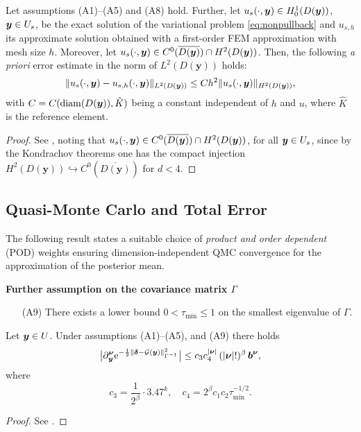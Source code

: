 \documentclass[graybox]{svmult}
\begin{document}
\begin{theorem}
    \label{thm: FEM-L2}
    Let assumptions {\rm (A1)--(A5)} and {\rm (A8)} hold. Further, let $u_s(\cdot, {\boldsymbol{y}}) \in H_0^1(D(\boldsymbol{y}))$, ${\boldsymbol{y}} \in U_s$, be the exact solution of the variational problem \eqref{eq:nonpullback} and $u_{s, h}$ its approximate solution obtained with a first-order FEM approximation with mesh size $h$. Moreover, let $u_s(\cdot, {\boldsymbol{y}}) \in C^0(\overline{D(\boldsymbol{y})}) \cap H^{2}(D(\boldsymbol{y}))$. Then, the following \textit{a priori} error estimate in the norm of $L^2(D(\boldsymbol{y}))$ holds:
    $$
       \| u_s(\cdot, {\boldsymbol{y}}) - u_{s, h}(\cdot, {\boldsymbol{y}}) \|_{L^2(D(\boldsymbol{y}))} \leq C h^{2} \| u_s(\cdot, {\boldsymbol{y}}) \|_{H^{2}(D(\boldsymbol{y}))},
    $$
    with $C = C({\rm diam}(D(\boldsymbol{y})), \hat{K})$ being a constant independent of $h$ and $u$, where $\hat{K}$ is the reference element.
\end{theorem}

\begin{proof}
     See \cite[Theorem 4.7]{Qu2014}, noting that $u_s(\cdot, {\boldsymbol{y}}) \in C^0(\overline{D(\boldsymbol{y})}) \cap H^{2}(D(\boldsymbol{y}))$, for all ${\boldsymbol{y}} \in U_s$, since by the Kondrachov theorems one has the compact injection $H^{2}(D(\boldsymbol{y})) \hookrightarrow C^0(\overline{D(\boldsymbol{y})})$ for $d < 4$.
\end{proof}

\subsection{Quasi-Monte Carlo and Total Error}
\label{subsec:QMC error}

The following result states a suitable choice of {\em product and order dependent} (POD) weights ensuring dimension-independent QMC convergence for the approximation of the posterior mean.

\bigskip

\noindent \textbf{Further assumption on the covariance matrix $\Gamma$}

\begin{addmargin}[1.3em]{0em}
\begin{enumerate}
    \item[(A9)] There exists a lower bound $0 < \tau_{\min} \leq 1$ on the smallest eigenvalue of $\Gamma$. \label{a9}
\end{enumerate}
\end{addmargin}

\begin{theorem} \label{thm: inverse exponential}
Let ${\boldsymbol{y}} \in U$. Under assumptions {\rm (A1)--(A5)}, and {\rm (A9)}
there holds
$$
\big|\partial_{{\boldsymbol{y}}}^{{\boldsymbol{\nu}}}{\rm e}^{-\frac12 \|\boldsymbol\delta-\mathcal G({\boldsymbol{y}})\|_{\Gamma^{-1}}^2}\big|\leq c_3 c_4^{|\boldsymbol{\nu}|}  \mathop{(|\boldsymbol{\nu}|! )^\beta}\boldsymbol{b}^{\boldsymbol{\nu}},
$$
where
$$
c_3=\frac{1}{2^{\beta}}\cdot 3.47^k,\quad c_4=2^{\beta} c_1 c_2 \tau_{\min}^{-1/2}.
$$
\end{theorem}
\begin{proof} See \cite[Lemma 5.3]{ks24}. \end{proof} 
\end{document}
